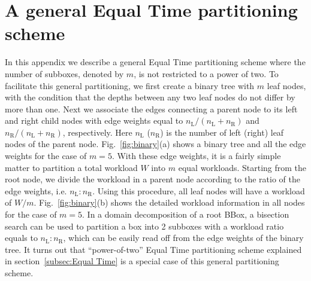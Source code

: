 \commentoutA{\documentclass[prl,aps,twocolumn,showpacs,twocolumngrid,superbib]{revtex4}}
\begin{document}
\section{A general Equal Time partitioning scheme}
\label{appex:GET}
In this appendix we describe a general Equal Time partitioning scheme where 
the number of subboxes, denoted by $m$, is not restricted to a power of two.
To facilitate this general 
partitioning, we first create a binary tree with $m$ leaf nodes, with
the condition that the depths between any two leaf nodes do not differ by more
than one. 
Next we associate the edges connecting a parent node to its left and 
right child nodes with edge weights equal to 
$n_{\scriptscriptstyle\mathrm{L}}/(n_{\scriptscriptstyle\mathrm{L}}+n_{\scriptscriptstyle\mathrm{R}})$
and $n_{\scriptscriptstyle\mathrm{R}}/(n_{\scriptscriptstyle\mathrm{L}}+n_{\scriptscriptstyle\mathrm{R}})$, respectively. 
Here $n_{\scriptscriptstyle\mathrm{L}}$ ($n_{\scriptscriptstyle\mathrm{R}}$)
is the number of left (right) leaf nodes of the parent node. 
Fig.~\ref{fig:binary}(a) shows a binary tree and all the edge weights 
for the case of $m=5$.
With these edge weights, it is a fairly simple matter 
to partition a total workload $W$ into $m$ equal workloads. Starting
from the root node,
we divide the workload in a parent node
according to the ratio of the edge weights, i.e. $n_{\scriptscriptstyle\mathrm{L}} : n_{\scriptscriptstyle\mathrm{R}} $. Using this procedure, all
leaf nodes will have a workload of $W/m$. Fig.~\ref{fig:binary}(b) shows the 
detailed workload information in all nodes for the case of $m=5$. In a domain
decomposition of a root BBox, a bisection search can be used to partition
a box into 2 subboxes with a workload ratio equals to 
$n_{\scriptscriptstyle\mathrm{L}} : n_{\scriptscriptstyle\mathrm{R}}$,
which can be easily read off from the edge weights of the binary tree.
It turns out that ``power-of-two'' Equal Time partitioning scheme 
explained in section~\ref{subsec:Equal Time} is a special 
case of this general partitioning scheme. 
\end{document}
